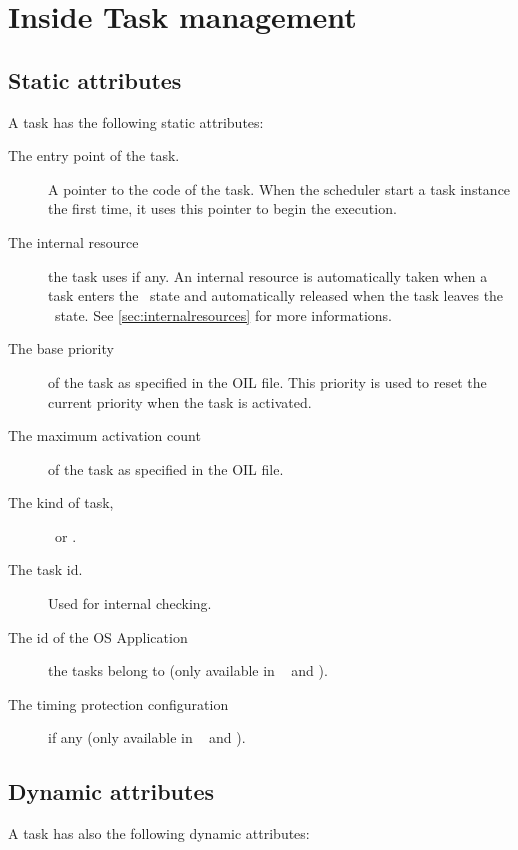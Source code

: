 
\section{Inside Task management}
\label{sec:addtaskstate}

\subsection{Static attributes}

A task has the following static attributes:

\begin{description}
\item[The entry point of the task.] A pointer to the code of the task. When the scheduler start a task instance the first time, it uses this pointer to begin the execution.
\item[The internal resource] the task uses if any. An internal resource is automatically taken when a task enters the \RUNNING\ state and automatically released when the task leaves the \RUNNING\ state. See \ref{sec:internalresources} for more informations.
\item[The base priority] of the task as specified in the OIL file. This priority is used to reset the current priority when the task is activated.
\item[The maximum activation count] of the task as specified in the OIL file.
\item[The kind of task,] \BASIC\ or \EXTENDED.
\item[The task id.] Used for internal checking.
\item[The id of the OS Application] the tasks belong to (only available in \autosar\  and ).
\item[The timing protection configuration] if any (only available in \autosar\  and ).
\end{description}

\subsection{Dynamic attributes}

A task has also the following dynamic attributes:

